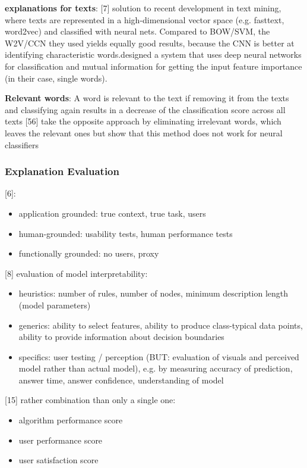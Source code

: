 \textbf{explanations for texts}:
[7] solution to recent development in text mining, where texts are represented in a high-dimensional vector space (e.g. fasttext, word2vec) and classified with neural nets. Compared to BOW/SVM, the W2V/CCN they used yields equally good results, because the CNN is better at identifying characteristic words.\newline
[19] designed a system that uses deep neural networks for classification and mutual information for getting the input feature importance (in their case, single words). \newline

\textbf{Relevant words}: A word is relevant to the text if removing it from the texts and classifying again results in a decrease of the classification score across all texts
[56] take the opposite approach by eliminating irrelevant words, which leaves the relevant ones but show that this method does not work for neural classifiers






\subsubsection{Explanation Evaluation}
[6]:
\begin{itemize}
	\item application grounded: true context, true task, users
	\item human-grounded: usability tests, human performance tests
	\item functionally grounded: no users, proxy
\end{itemize}
[8] evaluation of model interpretability:
\begin{itemize}
	\item heuristics: number of rules, number of nodes, minimum description length (model parameters)
	\item generics: ability to select features, ability to produce class-typical data points, ability to provide information about decision boundaries
	\item specifics: user testing / perception (BUT: evaluation of visuals and perceived model rather than actual model), e.g. by measuring accuracy of prediction, answer time, answer confidence, understanding of model
\end{itemize}
[15] rather combination than only a single one:
\begin{itemize}
	\item algorithm performance score
	\item user performance score
	\item user satisfaction score 
\end{itemize}







